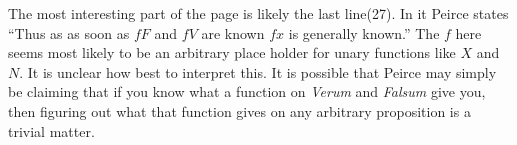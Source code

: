 The most interesting part of the page is likely the last line(27). In it Peirce states ``Thus as as soon as $fF$ and $fV$ are known $fx$ is generally known.'' The $f$ here seems most likely to be an arbitrary place holder for unary functions like $X$ and $N$. It is unclear how best to interpret this. It is possible that Peirce may simply be claiming that if you know what a function on \textit{Verum} and \textit{Falsum} give you, then figuring out what that function gives on any arbitrary proposition is a trivial matter.
